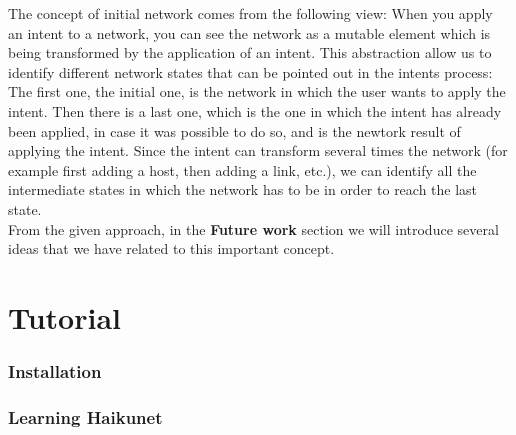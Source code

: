 The concept of initial network comes from the following view: When you apply an intent to a network, you can see the network as a mutable element which is being transformed by the application of an intent. This abstraction allow us to identify different network states that can be pointed out in the intents process: The first one, the initial one, is the network in which the user wants to apply the intent. Then there is a last one, which is the one in which the intent has already been applied, in case it was possible to do so, and is the newtork result of applying the intent. Since the intent can transform several times the network (for example first adding a host, then adding a link, etc.), we can identify all the intermediate states in which the network has to be in order to reach the last state. \\
From the given approach, in the \textbf{Future work} section we will introduce several ideas that we have related to this important concept.

\section{Tutorial}

\subsubsection{Installation}

\subsubsection{Learning Haikunet}

